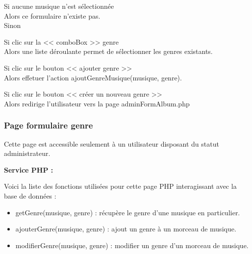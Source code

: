 			\begin{paragraphe}
				Si aucune musique n'est sélectionnée \\
				Alors ce formulaire n'existe pas. \\
				Sinon
			\end{paragraphe}

			\begin{paragraphe}
				Si clic sur la << comboBox >> genre \\
				Alors une liste déroulante permet de sélectionner les genres existants.
			\end{paragraphe}

			\begin{paragraphe}
				Si clic sur le bouton << ajouter genre >> \\
				Alors effetuer l'action ajoutGenreMusique(musique, genre).
			\end{paragraphe}

			\begin{paragraphe}
				Si clic sur le bouton << créer un nouveau genre >> \\
				Alors redirige l'utilisateur vers la page adminFormAlbum.php
			\end{paragraphe}

	\clearpage

		\subsubsection{Page formulaire genre}

			\begin{paragraphe}
				Cette page est accessible seulement à un utilisateur disposant du statut administrateur.
			\end{paragraphe}

			\begin{paragraphe}
				\textbf{Service PHP :}
			\end{paragraphe}

			\begin{paragraphe}
				Voici la liste des fonctions utilisées pour cette page PHP interagissant avec la base de données :
				\begin{itemize}
					\item getGenre(musique, genre) : récupère le genre d'une musique en particulier.
					\item ajouterGenre(musique, genre) : ajout un genre à un morceau de musique.
					\item modifierGenre(musique, genre) : modifier un genre d'un morceau de musique.
				\end{itemize}
			\end{paragraphe}


